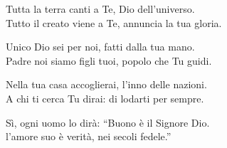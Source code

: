 
\strofa Tutta la terra canti a Te, Dio dell'universo.\\
Tutto il creato viene a Te, annuncia la tua gloria.

\spazio

\strofa Unico Dio sei per noi, fatti dalla tua mano.\\
Padre noi siamo figli tuoi, popolo che Tu guidi.

\spazio

\strofa Nella tua casa accoglierai, l'inno delle nazioni.\\
A chi ti cerca Tu dirai: di lodarti per sempre.

\spazio

\strofa Sì, ogni uomo lo dirà: ``Buono è il Signore Dio.\\
l'amore suo è verità, nei secoli fedele.''